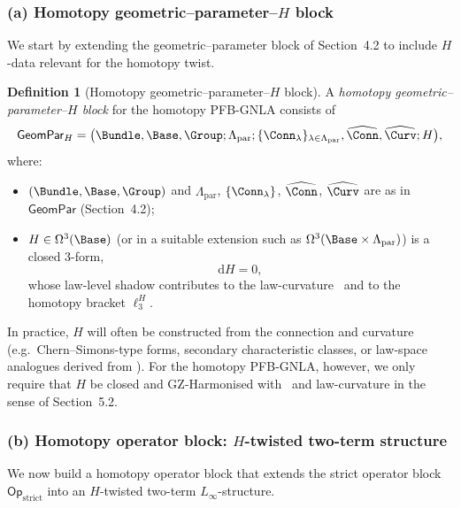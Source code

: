 \documentclass[11pt]{book}
\theoremstyle{plain}
\theoremstyle{definition}
\newtheorem{definition}[theorem]{Definition} \theoremstyle{remark}
\begin{document}
\subsubsection*{(a) Homotopy geometric–parameter–$H$ block}

We start by extending the geometric–parameter block of Section~4.2 to
include $H$-data relevant for the homotopy twist.

\begin{definition}[Homotopy geometric–parameter–$H$ block]
A \emph{homotopy geometric–parameter–$H$ block} for the homotopy
  PFB-GNLA consists of
  \[
     \mathsf{GeomPar}_H
     =
     \bigl(
       \Bundle,\Base,\Group;
       \Lambda_{\mathrm{par}};
       \{\Conn_\lambda\}_{\lambda\in\Lambda_{\mathrm{par}}},
       \widehat{\Conn},\widehat{\Curv};
       H
     \bigr),
  \]
  where:
  \begin{itemize}
    \item $(\Bundle,\Base,\Group)$ and
          $\Lambda_{\mathrm{par}}$, $\{\Conn_\lambda\}$,
          $\widehat{\Conn}$, $\widehat{\Curv}$ are as in
          $\mathsf{GeomPar}$ (Section~4.2);
    \item $H\in\Omega^3(\Base)$ (or in a suitable extension such as
          $\Omega^3(\Base\times\Lambda_{\mathrm{par}})$) is a closed
          3-form,
          \[
             \mathrm{d}H = 0,
          \]
          whose law-level shadow contributes to the law-curvature
          \GZLCurv\ and to the homotopy bracket $\ell_3^H$.
  \end{itemize}
\end{definition}

In practice, $H$ will often be constructed from the connection and
curvature (e.g.\ Chern–Simons-type forms, secondary characteristic
classes, or law-space analogues derived from \GZLCurv). For the
homotopy PFB-GNLA, however, we only require that $H$ be closed and
GZ-Harmonised with \GZTLC\ and law-curvature in the sense of
Section~5.2.



\subsubsection*{(b) Homotopy operator block: $H$-twisted two-term structure}

We now build a homotopy operator block that extends the strict operator
block $\mathsf{Op}_{\mathrm{strict}}$ into an $H$-twisted two-term
$L_\infty$-structure.
\end{document}
